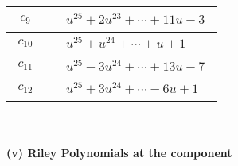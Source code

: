 \documentclass[1p]{elsarticle_modified}
\theoremstyle{definition}
\begin{document}
\begin{tabular}{m{50pt}|m{274pt}}
\hline $$\begin{aligned}c_{9}\end{aligned}$$&$\begin{aligned}
&u^{25}+2 u^{23}+\cdots+11 u-3
\end{aligned}$\\
\hline $$\begin{aligned}c_{10}\end{aligned}$$&$\begin{aligned}
&u^{25}+u^{24}+\cdots+u+1
\end{aligned}$\\
\hline $$\begin{aligned}c_{11}\end{aligned}$$&$\begin{aligned}
&u^{25}-3 u^{24}+\cdots+13 u-7
\end{aligned}$\\
\hline $$\begin{aligned}c_{12}\end{aligned}$$&$\begin{aligned}
&u^{25}+3 u^{24}+\cdots-6 u+1
\end{aligned}$\\
\hline
\end{tabular}\\~\\
\newpage\renewcommand{\arraystretch}{1}
\flushleft \textbf{(v) Riley Polynomials at the component}\newline \\
\end{document}
